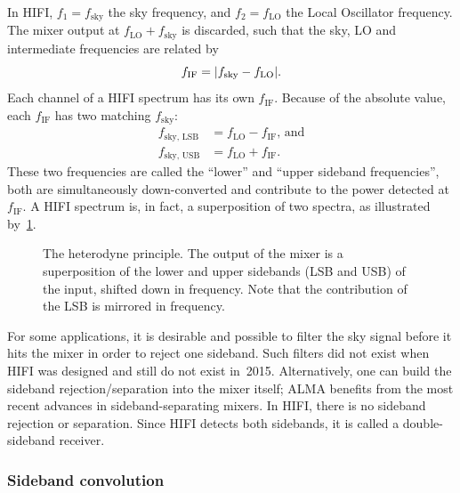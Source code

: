 In HIFI, $f_1=f_\text{sky}$ the sky frequency,
and $f_2=f_\text{LO}$ the Local Oscillator frequency.
The mixer output at $f_\text{LO}+f_\text{sky}$ is discarded, such that
the sky, LO and intermediate frequencies are related by
\begin{equation}
    f_\text{IF} = \abs{f_\text{sky} - f_\text{LO}}\text{.} \label{eq:heterodyne_question}
\end{equation}
Each channel of a HIFI spectrum has its own $f_\text{IF}$.
Because of the absolute value, each $f_\text{IF}$ has two matching $f_\text{sky}$:
\begin{equation}
    \begin{aligned}
        f_\text{sky, LSB} &= f_\text{LO} - f_\text{IF}    \text{, and}    \\
        f_\text{sky, USB} &= f_\text{LO} + f_\text{IF}    \text{.}
    \end{aligned}
    \label{eq:sideband_convolution}
\end{equation}
These two frequencies are called the ``lower'' and ``upper sideband frequencies'', both are simultaneously down-converted and contribute to the power detected at $f_\text{IF}$.
A HIFI spectrum is, in fact, a superposition of two spectra, as illustrated by~\cref{fig:heterodyne_principle}.
\begin{figure}
    \centering
    
    \caption{The heterodyne principle.
        The output of the mixer is a superposition of the lower and upper sidebands (LSB and USB) of the input, shifted down in frequency.
        Note that the contribution of the LSB is mirrored in frequency.}
    \label{fig:heterodyne_principle}
\end{figure}

For some applications, it is desirable and possible to filter the sky signal before it hits the mixer in order to reject one sideband.
Such filters did not exist when HIFI was designed and still do not exist in~2015.
Alternatively, one can build the sideband rejection/separation into the mixer itself; ALMA benefits from the most recent advances in sideband-separating mixers.
In HIFI, there is no sideband rejection or separation.
Since HIFI detects both sidebands, it is called a double-sideband receiver.



\subsubsection{Sideband convolution}

